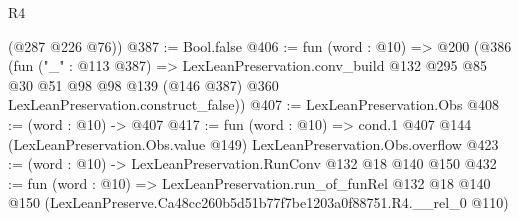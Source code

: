 \begin{lexlean}{R4}
\begin{coremodule}
      (@287 @226 @76))
@387 := Bool.false
@406 := fun (word : @10) =>
  @200
    (@386
      (fun ("_" : @113 @387) =>
      LexLeanPreservation.conv_build
        @132
        @295
        @85
        @30
        @51
        @98
        @98
        @139
        (@146 @387)
        @360
        LexLeanPreservation.construct_false))
@407 := LexLeanPreservation.Obs
@408 := (word : @10) -> @407
@417 := fun (word : @10) =>
  cond.{1} @407 @144 (LexLeanPreservation.Obs.value @149) LexLeanPreservation.Obs.overflow
@423 := (word : @10) -> LexLeanPreservation.RunConv @132 @18 @140 @150
@432 := fun (word : @10) =>
  LexLeanPreservation.run_of_funRel
    @132
    @18
    @140
    @150
    (LexLeanPreserve.Ca48cc260b5d51b77f7be1203a0f88751.R4.__rel_0 @110)
\end{coremodule}
\end{lexlean}
